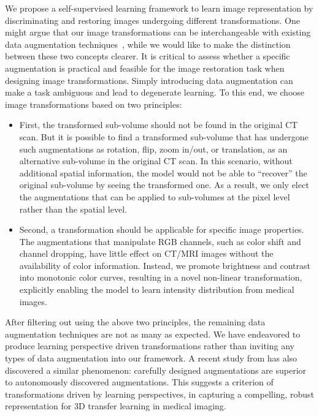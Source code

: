 We propose a self-supervised learning framework to learn image representation by discriminating and restoring images undergoing different transformations. One might argue that our image transformations can be interchangeable with existing data augmentation techniques~\citep{gan2015learning,wong2016understanding,perez2017effectiveness,shorten2019survey}, while we would like to make the distinction between these two concepts clearer. It is critical to assess whether a specific augmentation is practical and feasible for the image restoration task when designing image transformations. Simply introducing data augmentation can make a task ambiguous and lead to degenerate learning. To this end, we choose image transformations based on two principles:
\begin{itemize}
    \item First, the transformed sub-volume should not be found in the original CT scan. But it is possible to find a transformed sub-volume that has undergone such augmentations as rotation, flip, zoom in/out, or translation, as an alternative sub-volume in the original CT scan. In this scenario, without additional spatial information, the model would not be able to ``recover'' the original sub-volume by seeing the transformed one. As a result, we only elect the augmentations that can be applied to sub-volumes at the pixel level rather than the spatial level.
    \item Second, a transformation should be applicable for specific image properties. The augmentations that manipulate RGB channels, such as color shift and channel dropping, have little effect on CT/MRI images without the availability of color information. Instead, we promote brightness and contrast into monotonic color curves, resulting in a novel non-linear transformation, explicitly enabling the model to learn intensity distribution from medical images.
\end{itemize}
After filtering out using the above two principles, the remaining data augmentation techniques are not as many as expected. We have endeavored to produce learning perspective driven transformations rather than inviting any types of data augmentation into our framework. A recent study from \citet{chen2020simple} has also discovered a similar phenomenon: carefully designed augmentations are superior to autonomously discovered augmentations. This suggests a criterion of transformations driven by learning perspectives, in capturing a compelling, robust representation for 3D transfer learning in medical imaging.

